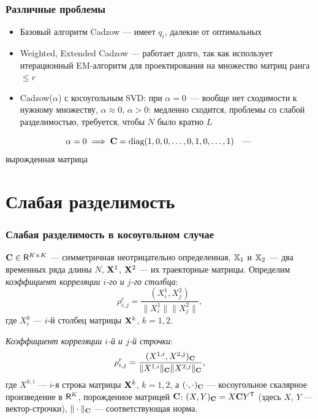 \documentclass[unicode, notheorems]{beamer}
\begin{document}
\begin{frame}
	\frametitle{Различные проблемы}
	\begin{itemize}
		\item Базовый алгоритм Cadzow --- имеет $q_i$, далекие от оптимальных
		\item Weighted, Extended Cadzow --- работает долго, так как использует итерационный EM-алгоритм для проектирования на множество матриц ранга $\le r$
		\item Cadzow($\alpha$) с косоугольным SVD: при $\alpha = 0$~--- вообще нет сходимости к нужному множеству, $\alpha \approx 0$, $\alpha > 0$: медленно сходится, проблемы со слабой разделимостью, требуется, чтобы $N$ было кратно $L$
	\end{itemize}
	\begin{equation*}
	\alpha = 0 \implies \mathbf{C} = \text{diag}(1, 0, 0, \ldots, 0, 1, 0, \ldots, 1) \quad \text{--- }
	\end{equation*}
	вырожденная матрица
\end{frame}

\section{Слабая разделимость}
\begin{frame} \small
	\frametitle{Слабая разделимость в косоугольном случае}
 $\mathbf{C} \in \mathsf{R}^{K \times K}$ --- симметричная неотрицательно определенная, $\mathbb{X}_1$ и $\mathbb{X}_2$~--- два временных ряда длины $N$, $\mathbf{X}^1$, $\mathbf{X}^2$ --- их траекторные матрицы. Определим \emph{коэффициент корреляции $i$-го и $j$-го столбца}:
\begin{equation*}
\rho^c_{i,j} = \frac{(X^1_i, X^2_j)}{\|X^1_i\| \|X^2_j\|},
\end{equation*}
где $X^k_i$ --- $i$-й столбец матрицы $\mathbf{X}^k$, $k = 1, 2$. 

\emph{Коэффициент корреляции $i$-й и $j$-й строчки}:
\begin{equation*}
\rho^r_{i,j} = \frac{(X^{1,i}, X^{2,j})_{\mathbf{C}}}{\|X^{1,i}\|_{\mathbf{C}} \|X^{2,j}\|_{\mathbf{C}}},
\end{equation*}
где $X^{k,i}$ --- $i$-я строка матрицы $\mathbf{X}^k$, $k = 1, 2$, а $(\cdot, \cdot)_{\mathbf{C}}$ --- косоугольное скалярное произведение в $\mathsf{R}^K$, порожденное матрицей $\mathbf{C}$: $(X, Y)_{\mathbf{C}} = X \mathbf{C} Y^{\mathsf{T}}$ (здесь $X$, $Y$ --- вектор-строчки), $\| \cdot \|_{\mathbf{C}}$ --- соответствующая норма.
\end{frame}
\end{document}
